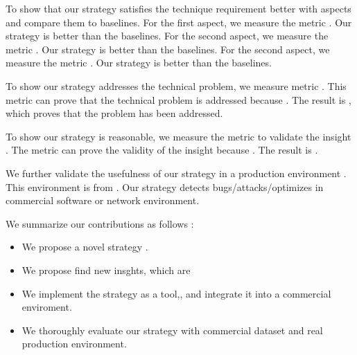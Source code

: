 To show that our strategy satisfies the technique requirement better with \blank{} aspects and compare them to \blank{} baselines. For the first aspect, we measure the metric \blank{}. Our strategy is  better than the baselines. For the second aspect, we measure the metric \blank{}. Our strategy is  better than the baselines.  For the second aspect, we measure the metric \blank{}. Our strategy is  better than the baselines.  

To show our strategy addresses the technical problem, we measure metric \blank{}. This metric can prove that the technical problem is addressed because \blank{}. The result is \blank{}, which proves that the problem has been addressed. 

To show our strategy is reasonable, we measure the metric \blank{} to validate the insight \blank{}. The metric can prove the validity of the insight \blank{} because \blank{}. The result is \blank{}. 

 We further validate the usefulness of our strategy in a production environment \blank{}. This environment is from \blank{}. Our strategy detects bugs/attacks/optimizes in commercial software or network environment. 

We summarize our contributions as follows :
\begin{itemize}
    \item We propose a novel strategy \blank{}.
    \item We propose find \blank{} new insghts, which are \blank{}
    \item We implement the strategy as a tool,\blank{}, and integrate it into a commercial enviroment. 
    \item We thoroughly evaluate our strategy with commercial dataset and real production environment. 
\end{itemize}



